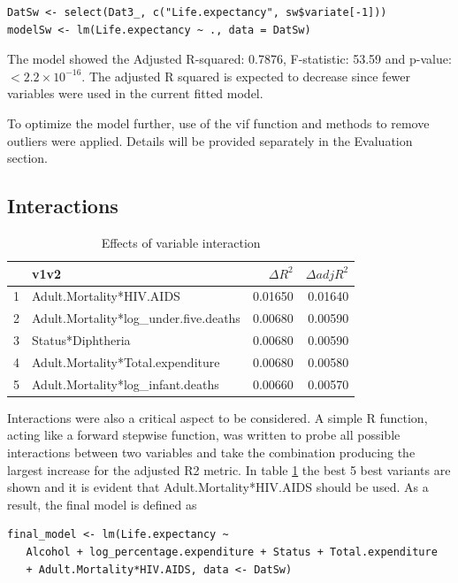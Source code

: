 \begin{verbatim}
DatSw <- select(Dat3_, c("Life.expectancy", sw$variate[-1]))
modelSw <- lm(Life.expectancy ~ ., data = DatSw)
\end{verbatim}

The model showed the Adjusted R-squared:  0.7876, F-statistic: 53.59 and p-value: $< 2.2\times 10^{-16}$. The adjusted R squared is expected to decrease since fewer variables were used in the current fitted model.

To optimize the model further, use of the vif function and methods to remove outliers were applied. Details will be provided separately in the Evaluation section. 

\subsection{Interactions}

\begin{table}[ht]
\centering
\begin{tabular}{rlrr}
  \hline
 & v1v2 & $\Delta R^2$ & $\Delta adjR^2$ \\ 
  \hline
1 & Adult.Mortality*HIV.AIDS & 0.01650 & 0.01640 \\ 
  2 & Adult.Mortality*log\_under.five.deaths & 0.00680 & 0.00590 \\ 
  3 & Status*Diphtheria & 0.00680 & 0.00590 \\ 
  4 & Adult.Mortality*Total.expenditure & 0.00680 & 0.00580 \\ 
  5 & Adult.Mortality*log\_infant.deaths & 0.00660 & 0.00570 \\ 
   \hline
\end{tabular}
\caption{Effects of variable interaction} 
\label{tab:int}
\end{table}

Interactions were also a critical aspect to be considered. A simple R function, acting like a forward stepwise function, was written to probe all possible interactions between two variables and take the combination producing the largest increase for the adjusted R2 metric. In table \ref{tab:int} the best 5 best variants are shown and it is evident that  Adult.Mortality*HIV.AIDS should be used. As a result, the final model is defined as
\begin{verbatim}
final_model <- lm(Life.expectancy ~ 
   Alcohol + log_percentage.expenditure + Status + Total.expenditure 
   + Adult.Mortality*HIV.AIDS, data <- DatSw)
\end{verbatim}

